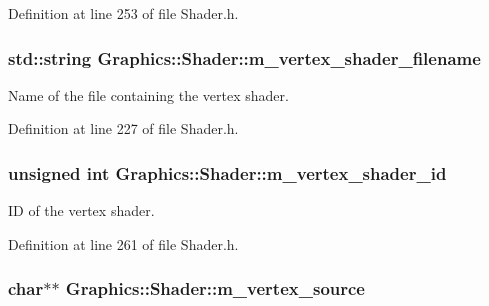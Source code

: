Definition at line 253 of file Shader.h.

\hypertarget{class_graphics_1_1_shader_aef681ca305c523ce6c4b413d0c90873c}{
\subsubsection[{m\_\-vertex\_\-shader\_\-filename}]{\setlength{\rightskip}{0pt plus 5cm}std::string {\bf Graphics::Shader::m\_\-vertex\_\-shader\_\-filename}}}
\label{class_graphics_1_1_shader_aef681ca305c523ce6c4b413d0c90873c}


Name of the file containing the vertex shader. 



Definition at line 227 of file Shader.h.

\hypertarget{class_graphics_1_1_shader_ab74712775fe53e797ac9a6b0ed874785}{
\subsubsection[{m\_\-vertex\_\-shader\_\-id}]{\setlength{\rightskip}{0pt plus 5cm}unsigned int {\bf Graphics::Shader::m\_\-vertex\_\-shader\_\-id}}}
\label{class_graphics_1_1_shader_ab74712775fe53e797ac9a6b0ed874785}


ID of the vertex shader. 



Definition at line 261 of file Shader.h.

\hypertarget{class_graphics_1_1_shader_a41febb8fce635e60755810d9559eeb4e}{
\subsubsection[{m\_\-vertex\_\-source}]{\setlength{\rightskip}{0pt plus 5cm}char$\ast$$\ast$ {\bf Graphics::Shader::m\_\-vertex\_\-source}}}
\label{class_graphics_1_1_shader_a41febb8fce635e60755810d9559eeb4e}


